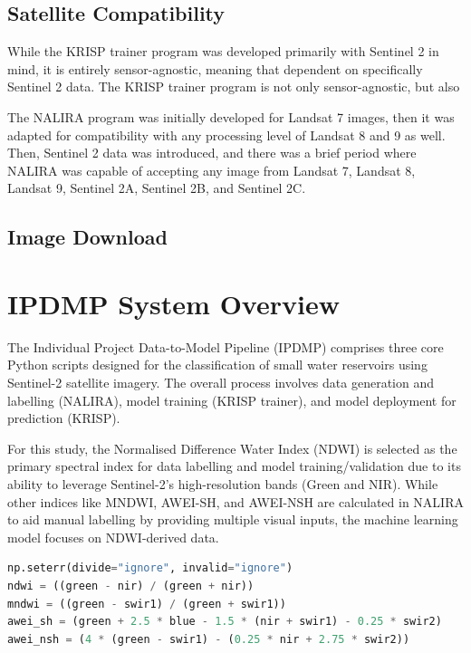 \subsection{Satellite Compatibility}
While the KRISP trainer program was developed primarily with Sentinel 2 in mind, it is entirely sensor-agnostic, meaning that dependent on specifically Sentinel 2 data. The KRISP trainer program is not only sensor-agnostic, but also 

The NALIRA program was initially developed for Landsat 7 images, then it was adapted for compatibility with any processing level of Landsat 8 and 9 as well. Then, Sentinel 2 data was introduced, and there was a brief period where NALIRA was capable of accepting any image from Landsat 7, Landsat 8, Landsat 9, Sentinel 2A, Sentinel 2B, and Sentinel 2C. 

\subsection{Image Download}


\section{IPDMP System Overview}
The Individual Project Data-to-Model Pipeline (IPDMP) comprises three core Python scripts designed for the classification of small water reservoirs using Sentinel-2 satellite imagery. The overall process involves data generation and labelling (NALIRA), model training (KRISP trainer), and model deployment for prediction (KRISP).

For this study, the Normalised Difference Water Index (NDWI) is selected as the primary spectral index for data labelling and model training/validation due to its ability to leverage Sentinel-2's high-resolution bands (Green and NIR). While other indices like MNDWI, AWEI-SH, and AWEI-NSH are calculated in NALIRA to aid manual labelling by providing multiple visual inputs, the machine learning model focuses on NDWI-derived data.

\begin{lstlisting}[language=Python, caption=Calculation of Water Detection Indices]
np.seterr(divide="ignore", invalid="ignore")
ndwi = ((green - nir) / (green + nir))
mndwi = ((green - swir1) / (green + swir1))
awei_sh = (green + 2.5 * blue - 1.5 * (nir + swir1) - 0.25 * swir2)
awei_nsh = (4 * (green - swir1) - (0.25 * nir + 2.75 * swir2))
\end{lstlisting}

